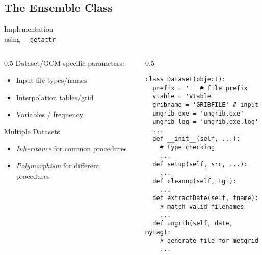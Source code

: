 \documentclass[hyperref={pdfpagelabels=false},compress,final]{beamer}
\newenvironment{myBox}[3][shadow=true]%
{\begin{center} \begin{minipage}{#2} \begin{beamerboxesrounded}[#1]{#3} \smallskip}%
      {\smallskip \end{beamerboxesrounded} \end{minipage} \end{center}}
\begin{document}
\subsection[Ensemble Class]{The Ensemble Class}

\begin{frame}[fragile=singleslide]{\hspace*{0.3cm} Implementation\\\hspace*{0.3cm} using \texttt{\_\_getattr\_\_}}
  \begin{columns}
    \begin{column}{0.5\textwidth}
      Dataset/GCM specific parameters: \smallskip
      \begin{itemize}
        \item Input file types/names\smallskip
        \item Interpolation tables/grid \smallskip
        \item Variables / frequency \smallskip
      \end{itemize}
        \begin{myBox}{0.9\textwidth}{Multiple Datasets}
          \begin{itemize}
            \item \textit{\color{purple} Inheritance} for common procedures \smallskip
            \item \textit{\color{teal} Polymorphism} for different procedures
          \end{itemize}
        \end{myBox}
    \end{column}
    \begin{column}{0.5\textwidth}
      \vspace*{-1.25cm}
      \begin{myBox}{1.0\textwidth}{}
        \footnotesize
        \begin{verbatim}
class Dataset(object):
  prefix = ''  # file prefix
  vtable = 'Vtable'
  gribname = 'GRIBFILE' # input
  ungrib_exe = 'ungrib.exe'
  ungrib_log = 'ungrib.exe.log'
  ...
  def __init__(self, ...):
    # type checking
    ...
  def setup(self, src, ...):
    ...
  def cleanup(self, tgt):
    ...
  def extractDate(self, fname):
    # match valid filenames
    ...
  def ungrib(self, date, mytag):
    # generate file for metgrid
    ...
        \end{verbatim}
      \end{myBox}
    \end{column}
  \end{columns}
\end{frame}
\end{document}

